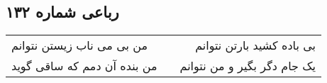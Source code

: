 \begin{center}
\section*{رباعی شماره ۱۳۲}
\label{sec:sh132}
\begin{longtable}{l p{0.5cm} r}
من بی می ناب زیستن نتوانم
&&
بی باده کشید بارتن نتوانم
\\
من بنده آن دمم که ساقی گوید
&&
یک جام دگر بگیر و من نتوانم
\\
\end{longtable}
\end{center}
